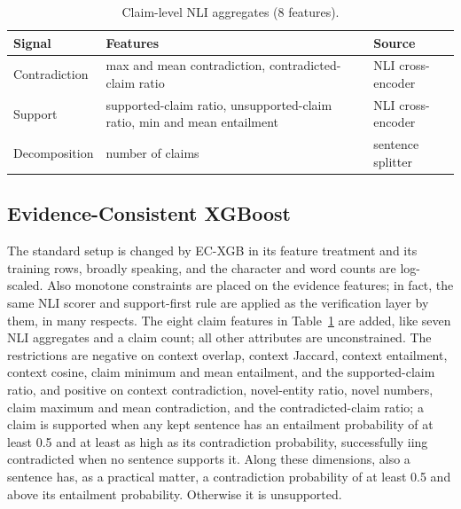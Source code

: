 \documentclass[a4paper,fleqn]{cas-sc}
\begin{document}
\begin{table}[pos=htbp]
  \centering
  \caption{Claim-level NLI aggregates (8 features).}
  \label{tab:claim}
  \begin{tabular}{>{\raggedright\arraybackslash}p{2.3cm}>{\raggedright\arraybackslash}p{7.0cm}>{\raggedright\arraybackslash}p{2.9cm}}
    \toprule
    \textbf{Signal} & \textbf{Features}                                                       & \textbf{Source}   \\
    \midrule
    Contradiction   & max and mean contradiction, contradicted-claim ratio                    & NLI cross-encoder \\
    Support         & supported-claim ratio, unsupported-claim ratio, min and mean entailment & NLI cross-encoder \\
    Decomposition   & number of claims                                                        & sentence splitter \\
    \bottomrule
  \end{tabular}
\end{table}

\subsection{Evidence-Consistent XGBoost}

The standard setup is changed by EC-XGB in its feature treatment and its training rows, broadly speaking, and the character and word counts are log-scaled. Also monotone constraints are placed on the evidence features; in fact, the same NLI scorer and support-first rule are applied as the verification layer by them, in many respects. The eight claim features in Table~\ref{tab:claim} are added, like seven NLI aggregates and a claim count; all other attributes are unconstrained. The restrictions are negative on context overlap, context Jaccard, context entailment, context cosine, claim minimum and mean entailment, and the supported-claim ratio, and positive on context contradiction, novel-entity ratio, novel numbers, claim maximum and mean contradiction, and the contradicted-claim ratio; a claim is supported when any kept sentence has an entailment probability of at least 0.5 and at least as high as its contradiction probability, successfully iing contradicted when no sentence supports it. Along these dimensions, also a sentence has, as a practical matter, a contradiction probability of at least 0.5 and above its entailment probability. Otherwise it is unsupported.
\end{document}
